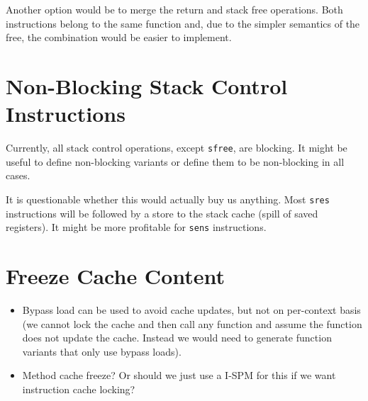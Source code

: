 \documentclass[a4paper,fontsize=10pt,twoside,DIV15,BCOR12mm,headinclude=true,footinclude=false,pagesize,bibtotoc]{scrbook}
\newcommand{\comment}[3]{

\textsf{\textbf{#1}} {\color{#3}#2}}
\newcommand{\martin}[1]{\comment{Martin}{#1}{Blue}}
\newcommand{\stefan}[1]{\comment{Stefan}{#1}{RoyalPurple}}
\renewcommand{\martin}[1]{}
\renewcommand{\stefan}[1]{}
\begin{document}
Another option would be to merge the return and stack free operations. Both
instructions belong to the same function and, due to the simpler semantics of
the free, the combination would be easier to implement.

\stefan{I doubt that merging those functions would actually gain something. It reduces the flexibility for the compiler to perform ensure
only where needed, may limit the possibilities for passing data over the stack cache, and requires additional
code to restore the special registers that are required to track the size of the stack. Only gain I see is when the word in front of the
method code that stores the size of the method is used to store the stack size as 16bit value, and limit the size of the method to a 16bit
value. Then no additional data needs to be transferred. The stack control instructions would still be required to allow the compiler to
allocate stack e.g. only in certain contexts.}

\martin{If stack operations only happens at function call
and return this merge would make sense. It makes also
very clear that M$ memory access and S$ memory access are coordinated.}

\section{Non-Blocking Stack Control Instructions}

Currently, all stack control operations, except \texttt{sfree}, are blocking. It
might be useful to define non-blocking variants or define them to be
non-blocking in all cases.

It is questionable whether this would actually buy us anything. Most
\texttt{sres} instructions will be followed by a store to the stack cache
(spill of saved registers). It might be more profitable for \texttt{sens}
instructions.

\section{Freeze Cache Content}

\begin{itemize}
  \item Bypass load can be used to avoid cache updates, but not on per-context basis (we cannot lock the cache and then call any function
  and assume the function does not update the cache. Instead we would need to generate function variants that only use bypass loads).
  \item Method cache freeze? Or should we just use a I-SPM for this if we want instruction cache locking?
\end{itemize}
\end{document}
